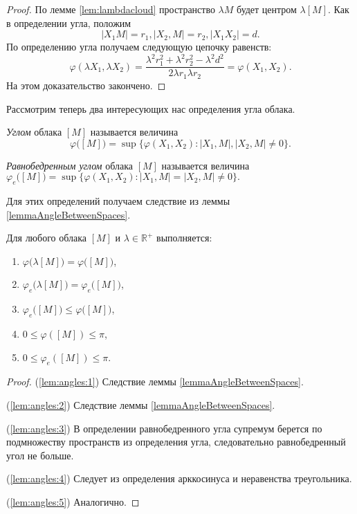 \begin{proof}
  По лемме \ref{lem:lambdacloud} пространство \( \lambda M \) будет центром \( \lambda
    [M]
  \). Как в определении угла, положим \[ |X_1 M| = r_1, | X_2, M | =r_2,
    |X_1
  X_2| = d.\] По определению угла получаем следующую цепочку
  равенств: \[ \varphi (\lambda X_1, \lambda X_2) = \frac{\lambda
    ^{2} r_1^2 + \lambda ^2 r_2^2 - \lambda^2 d^2}{2 \lambda  r_1
    \lambda r_2} =
    \varphi (X_1, X_2).
  \]
  На этом доказательство закончено.
\end{proof}
Рассмотрим теперь два интересующих нас определения угла облака.
\begin{defin}
  \emph{Углом} облака $ [M] $ называется величина
  \[
    \varphi \big([M]\big)= \sup \big\{\varphi (X_1, X_2) \colon | X_1,M
    |, |X_2,M| \neq 0\big\}.
  \]
\end{defin}
\begin{defin}
  \emph{Равнобедренным углом} облака $ [M] $ называется величина \(
    \varphi_e \big([M]\big) = \sup \big\{\varphi (X_1, X_2) \colon |X_1,M |
  = |X_2,M| \neq 0\big\}. \)
\end{defin}
Для этих определений получаем следствие из леммы \ref{lemmaAngleBetweenSpaces}.
\begin{lemma}
  Для любого облака \( [M] \) и \( \lambda \in\mathbb{R}^+ \)
  выполняется\textup{:}\label{lem:angles}
  \begin{enumerate}
    \item \(\varphi \big(\lambda [M]\big) = \varphi
      \big([M]\big)\),\label{lem:angles:1}
    \item \(\varphi_e \big(\lambda [M]\big) = \varphi_e
      \big([M]\big)\),\label{lem:angles:2}
    \item \( \varphi_e \big([M]\big) \le \varphi \big([M]\big)
      \),\label{lem:angles:3}
    \item \(0 \le \varphi ([M]) \le \pi\),\label{lem:angles:4}
    \item \(0 \le \varphi_e ([M]) \le \pi\).\label{lem:angles:5}
  \end{enumerate}
\end{lemma}
\begin{proof}
    (\ref{lem:angles:1}) Следствие леммы \ref{lemmaAngleBetweenSpaces}.

    (\ref{lem:angles:2}) Следствие леммы \ref{lemmaAngleBetweenSpaces}.

    (\ref{lem:angles:3}) В определении равнобедренного угла супремум берется по
  подмножеству пространств из определения угла, следовательно равнобедренный
  угол не больше.

  (\ref{lem:angles:4})  Следует из определения арккосинуса и неравенства
  треугольника.

  (\ref{lem:angles:5}) Аналогично.
\end{proof}
